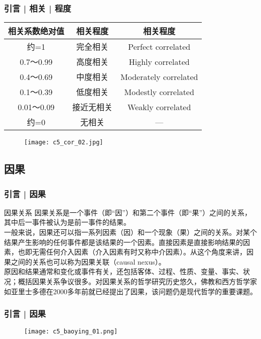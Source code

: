 \begin{frame}
  \frametitle{引言 | 相关 | 程度}
  \begin{table}
    \centering
    \begin{tabular}{ccc}
      \hline
      \rowcolor{blue!50} 相关系数绝对值 & 相关程度 & 相关程度\\
      \hline
      约=1 & 完全相关 & Perfect correlated\\
      0.7～0.99 & 高度相关 & Highly correlated\\
      0.4～0.69 & 中度相关 & Moderately correlated\\
      0.1～0.39 & 低度相关 & Modestly correlated\\
      0.01～0.09 & 接近无相关 & Weakly correlated\\
      约=0 & 无相关 & ---\\
      \hline
    \end{tabular}
  \end{table}
  \begin{figure}
    \centering
    \texttt{[image: c5\_cor\_02.jpg]}
  \end{figure}
\end{frame}

\subsection{因果}
\begin{frame}
  \frametitle{引言 | 因果}
  \begin{block}{因果关系}
    因果关系是一个事件（即“因”）和第二个事件（即“果”）之间的关系，其中后一事件被认为是前一事件的结果。\\
    \vspace{0.5em}
一般来说，因果还可以指一系列因素（因）和一个现象（果）之间的关系。对某个结果产生影响的任何事件都是该结果的一个因素。直接因素是直接影响结果的因素，也即无需任何介入因素（介入因素有时又称中介因素）。从这个角度来讲，因果之间的关系也可以称为因果关联（causal nexus）。\\
    \vspace{0.5em}
原因和结果通常和变化或事件有关，还包括客体、过程、性质、变量、事实、状况；概括因果关系争议很多。对因果关系的哲学研究历史悠久，佛教和西方哲学家如亚里士多德在2000多年前就已经提出了因果，该问题仍是现代哲学的重要课题。
  \end{block}
\end{frame}

\begin{frame}
  \frametitle{引言 | 因果}
  \begin{figure}
    \centering
    \texttt{[image: c5\_baoying\_01.png]}
  \end{figure}
\end{frame}


